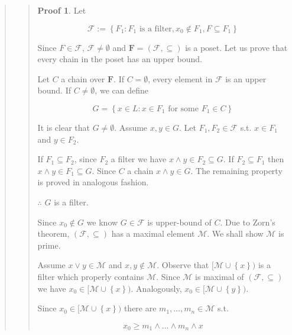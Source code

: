 \documentclass[a4paper, 12pt]{article}
\theoremstyle{definition}
\theoremstyle{definition}
\theoremstyle{definition}
\newtheorem{pro}{Proof}
\begin{document}
\begin{quote}
\begin{quote}
\begin{pro}
    Let 

    \begin{equation*}
        \mathcal{F} := \left\{ F_1 : F_1 \text{ is a filter}, x_0 \not\in F_1,F \subseteq F_1 \right\} 
    \end{equation*}

    Since $F \in \mathcal{F}$, $\mathcal{F} \neq \emptyset$ and $\textbf{F} = (\mathcal{F}, \subseteq )$ 
    is a poset. Let us prove that every chain in the poset 
    has an upper bound.

    Let $C$ a chain over $\textbf{F}$. If $C = \emptyset$, every 
    element in $\mathcal{F}$ is an upper bound. If $C \neq \emptyset$,
    we can define 

    \begin{equation*}
        G = \left\{ x \in L : x \in F_1 \text{ for some } F_1 \in C \right\} 
    \end{equation*}

    It is clear that $G \neq \emptyset$. Assume $x, y \in G$. Let $F_1, F_2 \in
    \mathcal{F}$ s.t. $x \in F_1$ and $y \in F_2$.

    If $F_1 \subseteq F_2$, since $F_2$ a filter we have $x \land  y \in F_2
    \subseteq G$. If $F_2 \subseteq F_1$ then $x\land  y \in F_1 \subseteq G$.
    Since $C$ a chain $x \land  y \in G$. The remaining 
    property is proved in analogous fashion.

    $\therefore $ $G$ is a filter. 

    Since $x_0 \not\in G$ we know $G \in \mathcal{F}$ is upper-bound of $C$.
    Due to Zorn's theorem, $(\mathcal{F},\subseteq )$ has a maximal element
    $\mathcal{M}$. We shall show $\mathcal{M}$ is prime.

    Assume $x \lor  y \in \mathcal{M}$ and $x, y \not\in \mathcal{M}$.
    Observe that $[\mathcal{M} \cup \left\{ x \right\}) $ is a filter 
    which properly contains $\mathcal{M}$. Since $\mathcal{M}$
    is maximal of $(\mathcal{F}, \subseteq)$ we have $x_0 \in [\mathcal{M} \cup \left\{ x \right\}) $.
    Analogously, $x_0 \in [\mathcal{M} \cup \left\{ y \right\} )$. 
    
    Since $x_0 \in [\mathcal{M} \cup \left\{ x \right\}) $ there 
    are $m_1, \ldots, m_n \in \mathcal{M}$ s.t. 

    \begin{equation*}
        x_0 \geq m_1 \land  \ldots \land  m_n \land  x
    \end{equation*}


\end{pro}
\end{quote}
\end{quote}
\end{document}
